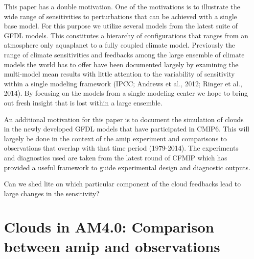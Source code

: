 \documentclass[11pt]{article}   	%
\begin{document}
This paper has a double motivation.  One of the motivations is to illustrate the wide range of sensitivities to perturbations 
that can be achieved with a single base model.  For this purpose we utilize several models from the latest suite of GFDL 
models.  This constitutes a hierarchy of configurations that ranges from an atmosphere only aquaplanet to a fully coupled 
climate model.  Previously the range of climate sensitivities and feedbacks among the large ensemble of climate models 
the world has to offer have been documented largely by examining the multi-model mean results with little attention to 
the variability of sensitivity within a single modeling framework (IPCC; Andrews et al., 2012; Ringer et al., 2014).  By 
focusing on the models from a single modeling center we hope to bring out fresh insight that is lost within a large ensemble.

An additional motivation for this paper is to document the simulation of clouds in the newly developed GFDL models that 
have participated in CMIP6.  This will largely be done in the context of the amip experiment and comparisons to observations
that overlap with that time period (1979-2014).  The experiments and diagnostics used are taken from the latest 
round of CFMIP which has provided a useful framework to guide experimental design and diagnostic outputs.       

Can we shed lite on which particular component of the cloud feedbacks lead to large changes in the sensitivity?  

\section{Clouds in AM4.0: Comparison between amip and observations}
\end{document}
